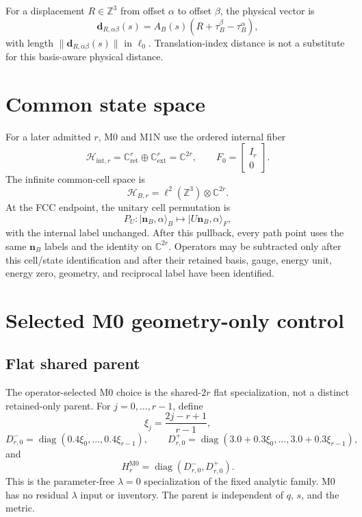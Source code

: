 \documentclass[11pt]{article}
\newcommand{\CC}{\mathbb C}
\newcommand{\ZZ}{\mathbb Z}
\begin{document}
For a displacement $R\in\ZZ^3$ from offset $\alpha$ to offset $\beta$, the physical
vector is
\begin{equation}
 \mathbf d_{R,\alpha\beta}(s)
 =A_B(s)(R+\tau_B^\beta-\tau_B^\alpha),
\end{equation}
with length $\lVert\mathbf d_{R,\alpha\beta}(s)\rVert$ in $\ell_0$.  Translation-index
distance is not a substitute for this basis-aware physical distance.

\section{Common state space}

For a later admitted $r$, M0 and M1N use the ordered internal fiber
\begin{equation}
 \mathcal H_{\mathrm{int},r}
 =\CC^r_{\mathrm{ret}}\oplus\CC^r_{\mathrm{ext}}
 =\CC^{2r},
 \qquad
 F_0=\begin{bmatrix}I_r\\0\end{bmatrix}.
\end{equation}
The infinite common-cell space is
\begin{equation}
 \mathcal H_{B,r}=\ell^2(\ZZ^3)\otimes\CC^{2r}.
\end{equation}
At the FCC endpoint, the unitary cell permutation is
\begin{equation}
 P_U:\lvert\mathbf n_B,\alpha\rangle_B
 \longmapsto\lvert U\mathbf n_B,\alpha\rangle_F,
\end{equation}
with the internal label unchanged.  After this pullback, every path point uses the same
$\mathbf n_B$ labels and the identity on $\CC^{2r}$.  Operators may be subtracted only
after this cell/state identification and after their retained basis, gauge, energy unit,
energy zero, geometry, and reciprocal label have been identified.

\section{Selected M0 geometry-only control}

\subsection{Flat shared parent}

The operator-selected M0 choice is the shared-$2r$ flat specialization, not a distinct
retained-only parent.  For $j=0,\ldots,r-1$, define
\begin{equation}
 \xi_j=\frac{2j-r+1}{r-1},
\end{equation}
\begin{equation}
 D^-_{r,0}=\operatorname{diag}(0.4\xi_0,\ldots,0.4\xi_{r-1}),
 \qquad
 D^+_{r,0}=\operatorname{diag}(3.0+0.3\xi_0,\ldots,3.0+0.3\xi_{r-1}),
\end{equation}
and
\begin{equation}
 H_r^{\mathrm{M0}}=\operatorname{diag}(D^-_{r,0},D^+_{r,0}).
\end{equation}
This is the parameter-free $\lambda=0$ specialization of the fixed analytic family.  M0
has no residual $\lambda$ input or inventory.  The parent is independent of $q$, $s$,
and the metric.
\end{document}
